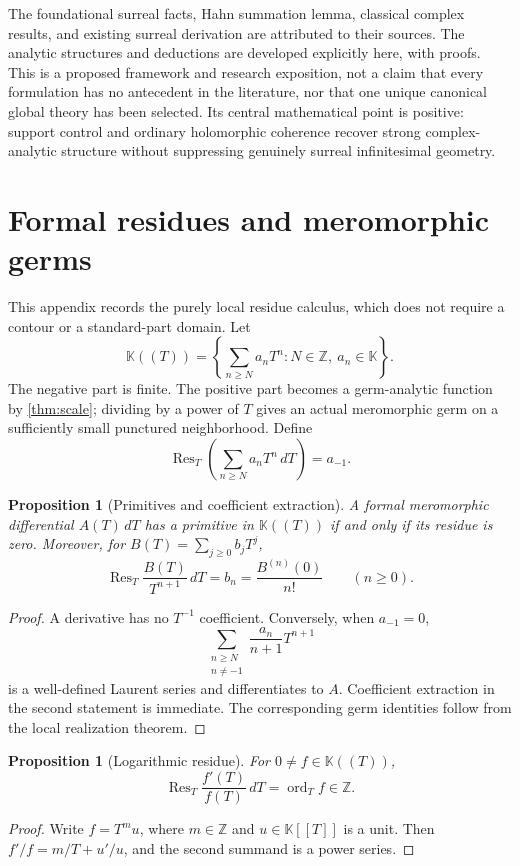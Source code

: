 \documentclass[11pt,a4paper]{article}
\numberwithin{equation}{section}
\newtheorem{proposition}[theorem]{Proposition}
\theoremstyle{definition}
\newcommand{\K}{\mathbb K}
\newcommand{\Z}{\mathbb Z}
\newcommand{\Res}{\operatorname{Res}}
\newcommand{\ord}{\operatorname{ord}}
\begin{document}
The foundational surreal facts, Hahn summation lemma, classical complex
results, and existing surreal derivation are attributed to their sources.
The analytic structures and deductions are developed explicitly here, with
proofs. This is a proposed framework and research exposition, not a claim
that every formulation has no antecedent in the literature, nor that one
unique canonical global theory has been selected. Its central mathematical
point is positive: support control and ordinary holomorphic coherence recover
strong complex-analytic structure without suppressing genuinely surreal
infinitesimal geometry.

\appendix
\section{Formal residues and meromorphic germs}
\label{sec:formalresidue}

This appendix records the purely local residue calculus, which does not
require a contour or a standard-part domain. Let
\[
 \K((T))=\left\{\sum_{n\geq N}a_nT^n:N\in\Z,\ a_n\in\K\right\}.
\]
The negative part is finite. The positive part becomes a germ-analytic
function by \cref{thm:scale}; dividing by a power of $T$ gives an actual
meromorphic germ on a sufficiently small punctured neighborhood. Define
\[
 \Res_T\left(\sum_{n\geq N}a_nT^n\,dT\right)=a_{-1}.
\]

\begin{proposition}[Primitives and coefficient extraction]
A formal meromorphic differential $A(T)\,dT$ has a primitive in $\K((T))$
if and only if its residue is zero. Moreover, for $B(T)=\sum_{j\geq0}b_jT^j$,
\[
 \Res_T\frac{B(T)}{T^{n+1}}\,dT=b_n=\frac{B^{(n)}(0)}{n!}
 \qquad(n\geq0).
\]
\end{proposition}
\begin{proof}
A derivative has no $T^{-1}$ coefficient. Conversely, when $a_{-1}=0$,
\[
 \sum_{\substack{n\geq N\\n\neq-1}}\frac{a_n}{n+1}T^{n+1}
\]
is a well-defined Laurent series and differentiates to $A$. Coefficient
extraction in the second statement is immediate. The corresponding germ
identities follow from the local realization theorem.
\end{proof}

\begin{proposition}[Logarithmic residue]
For $0\neq f\in\K((T))$,
\[
 \Res_T\frac{f'(T)}{f(T)}\,dT=\ord_T f\in\Z.
\]
\end{proposition}
\begin{proof}
Write $f=T^m u$, where $m\in\Z$ and $u\in\K[[T]]$ is a unit. Then
$f'/f=m/T+u'/u$, and the second summand is a power series.
\end{proof}
\end{document}
